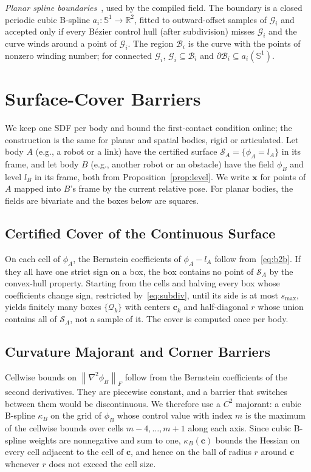 \documentclass[journal]{IEEEtran}
\theoremstyle{definition}
\newcommand{\R}{\mathbb{R}}
\newcommand{\Sone}{\mathbb{S}^1}
\newcommand{\norm}[1]{\left\lVert #1\right\rVert}
\begin{document}
\emph{Planar spline boundaries}~\cite{jo2027semantic}, used by the compiled field. The boundary is a closed periodic cubic
B-spline $a_i:\Sone\to\R^2$, fitted to outward-offset samples of $\mathcal G_i$ and accepted only if
every B\'ezier control hull (after subdivision) misses $\mathcal G_i$ and the curve winds around a
point of $\mathcal G_i$. The region $\mathcal B_i$ is the curve with the points of nonzero winding
number; for connected $\mathcal G_i$, $\mathcal G_i\subseteq\mathcal B_i$ and
$\partial\mathcal B_i\subseteq a_i(\Sone)$.

\section{Surface-Cover Barriers}\label{sec:cover}
We keep one SDF per body and bound the first-contact condition online; the construction is the same
for planar and spatial bodies, rigid or articulated. Let body $A$ (e.g., a robot or a link) have the
certified surface $\mathcal S_A=\{\phi_A=l_A\}$ in its frame, and let body $B$ (e.g., another robot or
an obstacle) have the field $\phi_B$ and level $l_B$ in its frame, both from
Proposition~\ref{prop:level}. We write $\mathbf x$ for points of $A$ mapped into $B$'s frame by the
current relative pose. For planar bodies, the fields are bivariate and the boxes below are squares.

\subsection{Certified Cover of the Continuous Surface}
On each cell of $\phi_A$, the Bernstein coefficients of $\phi_A-l_A$ follow from~\eqref{eq:b2b}. If
they all have one strict sign on a box, the box contains no point of $\mathcal S_A$ by the
convex-hull property. Starting from the cells and halving every box whose coefficients change sign,
restricted by~\eqref{eq:subdiv}, until its side is at most $s_{\max}$, yields finitely many boxes
$\{\mathcal Q_k\}$ with centers $\mathbf c_k$ and half-diagonal $r$ whose union contains all of
$\mathcal S_A$, not a sample of it. The cover is computed once per body.

\subsection{Curvature Majorant and Corner Barriers}
Cellwise bounds on $\norm{\nabla^2\phi_B}_F$ follow from the Bernstein coefficients of the
second derivatives. They are piecewise constant, and a barrier that switches between them would be
discontinuous. We therefore use a $C^2$ majorant: a cubic B-spline $\kappa_B$ on the grid of $\phi_B$
whose control value with index $m$ is the maximum of the cellwise bounds over cells $m-4,\dots,m+1$
along each axis. Since cubic B-spline weights are nonnegative and sum to one, $\kappa_B(\mathbf c)$
bounds the Hessian on every cell adjacent to the cell of $\mathbf c$, and hence on the ball of
radius $r$ around $\mathbf c$ whenever $r$ does not exceed the cell size.
\end{document}
